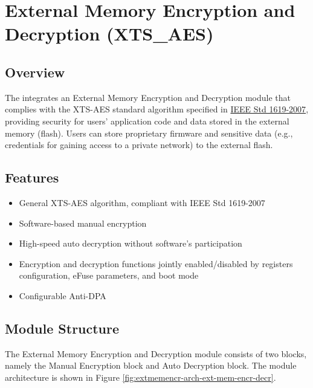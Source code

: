 \documentclass[main\_\_EN.tex]{subfiles}
\begin{document}

\ifglobal
\else
    {\let\clearpage\relax \listoftodos}
    \tableofcontents
\fi




\hypertarget{extmemencr}{}
\chapter{External Memory Encryption and Decryption (XTS\_AES)}
\label{mod:extmemencr}

\section{Overview}
The \chipname{} integrates an External Memory Encryption and Decryption module that complies with the XTS-AES standard algorithm specified in \href{https://ieeexplore.ieee.org/document/4493450}{IEEE Std 1619-2007}, providing security for users' application code and data stored in the external memory (flash). Users can store proprietary firmware and sensitive data (e.g., credentials for gaining access to a private network) to the external flash.

\section{Features}

\begin{itemize}
    \item General XTS-AES algorithm, compliant with IEEE Std 1619-2007
    \item Software-based manual encryption
    \item High-speed auto decryption without software's participation
    \item Encryption and decryption functions jointly enabled/disabled by registers configuration, eFuse parameters, and boot mode
    \item Configurable Anti-DPA
\end{itemize}


\section{Module Structure}
The External Memory Encryption and Decryption module consists of two blocks, namely the Manual Encryption block and Auto Decryption block. The module architecture is shown in Figure \ref{fig:extmemencr-arch-ext-mem-encr-decr}.
\end{document}
